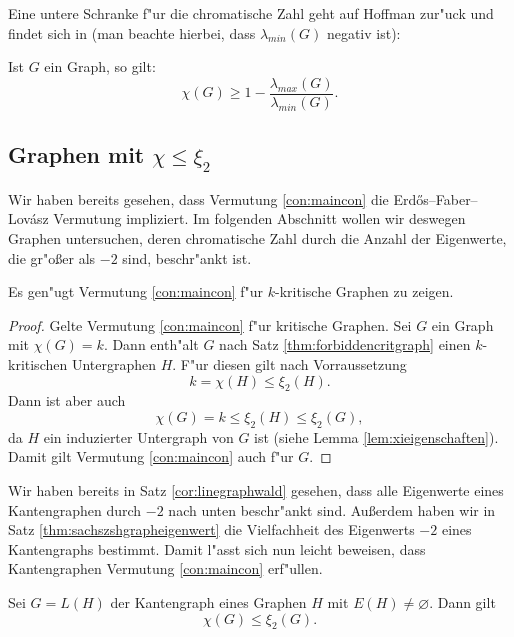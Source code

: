 Eine untere Schranke f"ur die chromatische Zahl geht auf Hoffman zur"uck und findet sich in \cite{Hoffman70}(man beachte hierbei, dass $\lambda_{min}(G)$ negativ ist):
\begin{theorem}
  Ist $G$ ein Graph, so gilt:
  $$\chi(G) \geq 1 - \frac{\lambda_{max}(G)}{\lambda_{min}(G)}.$$
  \label{thm:Hoffmanev}
\end{theorem}

\subsection{Graphen mit $\chi \leq \xi_{2}$}

Wir haben bereits gesehen, dass Vermutung \ref{con:maincon} die Erd\H{o}s--Faber--Lov\'asz Vermutung impliziert. Im folgenden Abschnitt wollen wir deswegen Graphen untersuchen, deren chromatische Zahl durch die Anzahl der Eigenwerte, die gr"o{\ss}er als $-2$ sind, beschr"ankt ist.
\begin{remark}
  Es gen"ugt Vermutung \ref{con:maincon} f"ur $k$-kritische Graphen zu zeigen. 
\end{remark}

\begin{proof}
  Gelte Vermutung \ref{con:maincon} f"ur kritische Graphen.
  Sei $G$ ein Graph mit $\chi(G) = k$. Dann enth"alt $G$ nach Satz \ref{thm:forbiddencritgraph} einen $k$-kritischen Untergraphen $H$. F"ur diesen gilt nach Vorraussetzung $$k= \chi(H) \leq \xi_{2}(H).$$ Dann ist aber auch $$ \chi(G) = k \leq \xi_{2}(H) \leq \xi_{2}(G) ,$$ da $H$ ein induzierter Untergraph von $G$ ist (siehe Lemma \ref{lem:xieigenschaften}).  Damit gilt Vermutung \ref{con:maincon} auch f"ur $G$.
\end{proof}

Wir haben bereits in Satz \ref{cor:linegraphwald} gesehen, dass alle Eigenwerte eines Kantengraphen durch $-2$ nach unten beschr"ankt sind. Au{\ss}erdem haben wir in Satz \ref{thm:sachszshgrapheigenwert} die Vielfachheit des Eigenwerts $-2$ eines Kantengraphs bestimmt. Damit l"asst sich nun leicht beweisen, dass Kantengraphen Vermutung \ref{con:maincon} erf"ullen. 
\begin{theorem}
  Sei $G=L(H)$ der Kantengraph eines Graphen $H$ mit $E(H)\neq \varnothing$. Dann gilt $$\chi(G) \leq \xi_2(G).$$
  \label{thm:linegraphconjecture}
\end{theorem}

